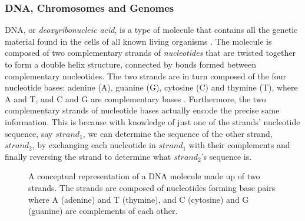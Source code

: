\subsubsection{DNA, Chromosomes and Genomes} \label{background:biology:dna_chromosomes_and_genomes}

DNA, or \textit{deoxyribonucleic acid}, is a type of molecule that contains all the genetic material found in the cells of all known living organisms \cite{nhgri_dna}. 
The molecule is composed of two complementary strands of \textit{nucleotides} that are twisted together to form a double helix structure, connected by bonds formed between complementary nucleotides.
The two strands are in turn composed of the four nucleotide bases: adenine (A), guanine (G), cytosine (C) and thymine (T), where A and T, and C and G are complementary bases \cite[p.15]{singh}.
Furthermore, the two complementary strands of nucleotide bases actually encode the precise same information.
This is because with knowledge of just one of the strands' nucleotide sequence, say \textit{$strand_1$}, we can determine the sequence of the other strand, \textit{$strand_2$}, by exchanging each nucleotide in \textit{$strand_1$} with their complements and finally reversing the strand to determine what \textit{$strand_2$}'s sequence is.

\begin{figure}[ht!]
\begin{center}
\caption{A conceptual representation of a DNA molecule made up of two strands. The strands are composed of nucleotides forming base pairs where A (adenine) and T (thymine), and C (cytosine) and G (guanine) are complements of each other.}
\label{background:biology:dna_and_chromosomes:figures:dna_strands}
\end{center}
\end{figure}


